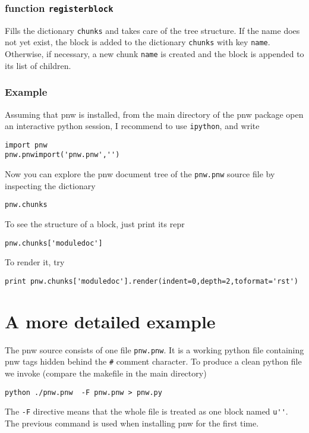 \documentclass[neutral,proc,reqno]{ml-gen}
\begin{document}
\subsubsection{function \lstinline!registerblock!}

Fills the dictionary \lstinline!chunks! and takes care of the tree
structure. If the name does not yet exist, the block is added to the
dictionary \lstinline!chunks! with key \lstinline!name!. Otherwise, if
necessary, a new chunk \lstinline!name! is created and the block is
appended to its list of children.

\subsubsection{Example}

Assuming that pnw is installed, from the main directory of the pnw
package open an interactive python session, I recommend to use
\lstinline!ipython!, and write

\begin{lstlisting}
import pnw
pnw.pnwimport('pnw.pnw','')
\end{lstlisting}
Now you can explore the pnw document tree of the \lstinline!pnw.pnw!
source file by inspecting the dictionary

\begin{lstlisting}
pnw.chunks
\end{lstlisting}
To see the structure of a block, just print its repr

\begin{lstlisting}
pnw.chunks['moduledoc']
\end{lstlisting}
To render it, try

\begin{lstlisting}
print pnw.chunks['moduledoc'].render(indent=0,depth=2,toformat='rst')
\end{lstlisting}
\section{A more detailed example}

The pnw source consists of one file \lstinline!pnw.pnw!. It is a working
python file containing pnw tags hidden behind the \lstinline!#! comment
character. To produce a clean python file we invoke (compare the
makefile in the main directory)

\begin{lstlisting}
python ./pnw.pnw  -F pnw.pnw > pnw.py
\end{lstlisting}
The \lstinline!-F! directive means that the whole file is treated as one
block named \lstinline!u''!. The previous command is used when
installing pnw for the first time.
\end{document}
